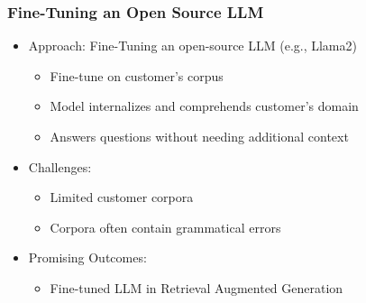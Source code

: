 \begin{frame}[fragile]\frametitle{Fine-Tuning an Open Source LLM}

\begin{itemize}
    \item Approach: Fine-Tuning an open-source LLM (e.g., Llama2)
    \begin{itemize}
        \item Fine-tune on customer's corpus
        \item Model internalizes and comprehends customer's domain
        \item Answers questions without needing additional context
    \end{itemize}
    \item Challenges:
    \begin{itemize}
        \item Limited customer corpora
        \item Corpora often contain grammatical errors
    \end{itemize}
    \item Promising Outcomes:
    \begin{itemize}
        \item Fine-tuned LLM in Retrieval Augmented Generation
    \end{itemize}
\end{itemize}
\end{frame}


